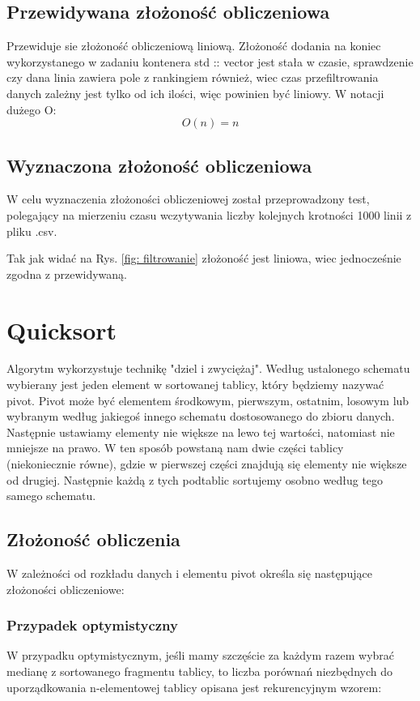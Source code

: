 \documentclass[12pt]{article}
\begin{document}
\subsection{Przewidywana złożoność obliczeniowa}
Przewiduje sie złożoność obliczeniową liniową. Złożoność dodania na koniec wykorzystanego w zadaniu kontenera std :: vector 
jest stała w czasie, sprawdzenie czy dana linia zawiera pole z rankingiem również, wiec czas przefiltrowania danych zależny jest 
tylko od ich ilości, więc powinien być liniowy. W notacji dużego O:
{\Large \begin{equation*}
       O(n) = n
\end{equation*}}
\subsection{Wyznaczona złożoność obliczeniowa}
W celu wyznaczenia złożoności obliczeniowej został przeprowadzony test, polegający na mierzeniu czasu wczytywania 
liczby kolejnych krotności 1000 linii z pliku .csv.

Tak jak widać na Rys. \ref{fig: filtrowanie} złożoność jest liniowa, wiec jednocześnie zgodna z przewidywaną.
\section{Quicksort}
Algorytm wykorzystuje technikę "dziel i zwyciężaj". Według ustalonego schematu wybierany jest jeden element w 
sortowanej tablicy, który będziemy nazywać pivot. Pivot może być elementem środkowym, pierwszym, ostatnim, losowym 
lub wybranym według jakiegoś innego schematu dostosowanego do zbioru danych. Następnie ustawiamy elementy nie 
większe na lewo tej wartości, natomiast nie mniejsze na prawo. W ten sposób powstaną nam dwie części 
tablicy (niekoniecznie równe), gdzie w pierwszej części znajdują się elementy nie większe od drugiej. 
Następnie każdą z tych podtablic sortujemy osobno według tego samego schematu. 
\subsection{Złożoność obliczenia}
W zależności od rozkładu danych i elementu pivot  określa się następujące złożoności obliczeniowe:
\subsubsection{Przypadek optymistyczny}
W przypadku optymistycznym, jeśli mamy szczęście za każdym razem wybrać medianę z sortowanego fragmentu tablicy, to liczba porównań niezbędnych do uporządkowania n-elementowej tablicy opisana jest rekurencyjnym wzorem:
\end{document}
